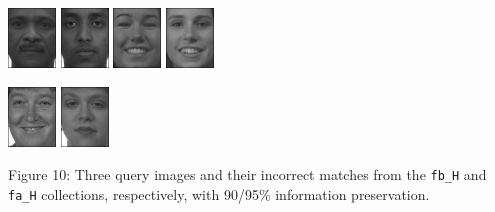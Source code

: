 \documentclass[ 12pt ]{article}
\begin{document}
\begin{enumerate}
\begin{enumerate}
                \begin{center}
                    \includegraphics[scale=1.7]{f_h_images/AnyConv.com__00183_940128_fb}
                    \includegraphics[scale=1.7]{f_h_images/AnyConv.com__00618_941031_fa}
                    \includegraphics[scale=1.7]{f_h_images/AnyConv.com__00451_940422_fb}
                    \includegraphics[scale=1.7]{f_h_images/AnyConv.com__00411_940422_fa}
                \end{center}
                \begin{center}
                    \includegraphics[scale=1.7]{f_h_images/AnyConv.com__00557_940519_fb}
                    \includegraphics[scale=1.7]{f_h_images/AnyConv.com__00276_940422_fa}
                \end{center}
                \begin{center}
                    \scriptsize
                    Figure 10: Three query images and their incorrect matches from the \verb|fb_H| and \verb|fa_H| collections, respectively, with 90/95\% information
                    preservation.
                \end{center}


\end{enumerate}
\end{enumerate}
\end{document}

